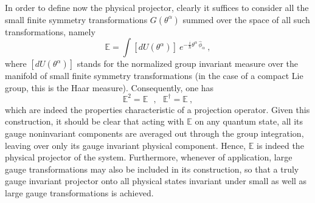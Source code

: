 \documentclass[a4paper,11pt]{article}
\def\proj{\mathbb E}
\begin{document}
In order to define now the physical projector, clearly it suffices to
consider all the small finite symmetry transformations $G(\theta^\alpha)$
summed over the space of all such transformations, namely
\begin{equation}
\proj=\int\left[dU(\theta^\alpha)\right]\ 
e^{-\frac{i}{\hbar}\theta^\alpha\,\hat{\phi}_\alpha}\ ,
\end{equation}
where $[dU(\theta^\alpha)]$ stands for the normalized group invariant measure
over the manifold of small finite symmetry transformations (in the case
of a compact Lie group, this is the Haar measure). Consequently, one has
\begin{equation}
\proj^2=\proj\ \ \ ,\ \ \ \proj^\dagger=\proj\ ,
\end{equation}
which are indeed the properties characteristic of a projection operator.
Given this construction, it should be clear that acting with $\proj$ on
any quantum state, all its gauge noninvariant components are averaged
out through the group integration, leaving over only its gauge invariant
physical component. Hence, $\proj$ is indeed the physical projector
of the system.\cite{Klaud1} Furthermore, whenever of application, large
gauge transformations may also be included in its construction, so that
a truly gauge invariant projector onto all physical states invariant
under small as well as large gauge transformations is achieved.
\end{document}
